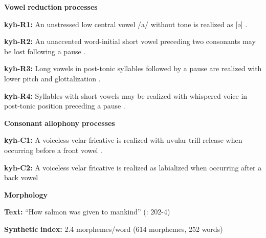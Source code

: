 \begin{styleBody}
\textbf{Vowel} \textbf{reduction} \textbf{processes}
\end{styleBody}

\begin{styleBody}
\textbf{kyh-R1:} An unstressed low central vowel /a/ without tone is realized as [ə] \citep[11]{Bright1957}.
\end{styleBody}

\begin{styleBody}
\textbf{kyh-R2:} An unaccented word-initial short vowel preceding two consonants may be lost following a pause \citep[53]{Bright1957}.
\end{styleBody}

\begin{styleBody}
\textbf{kyh-R3:} Long vowels in post-tonic syllables followed by a pause are realized with lower pitch and glottalization \citep[13]{Bright1957}.
\end{styleBody}

\begin{styleBody}
\textbf{kyh-R4:} Syllables with short vowels may be realized with whispered voice in post-tonic position preceding a pause \citep[13]{Bright1957}.
\end{styleBody}

\begin{styleBody}
\textbf{Consonant} \textbf{allophony} \textbf{processes}
\end{styleBody}

\begin{styleBody}
\textbf{kyh-C1:} A voiceless velar fricative is realized with uvular trill release when occurring before a front vowel \citep{Bright1957}.
\end{styleBody}

\begin{styleBody}
\textbf{kyh-C2:} A voiceless velar fricative is realized as labialized when occurring after a back vowel \citep[8]{Bright1957}
\end{styleBody}

\begin{styleBody}
\textbf{Morphology}
\end{styleBody}

\begin{styleBody}
\textbf{Text:} “How salmon was given to mankind” (\citealt{AnguloFreeland1971}: 202-4)
\end{styleBody}

\begin{styleBody}
\textbf{Synthetic} \textbf{index:} 2.4 morphemes/word (614 morphemes, 252 words)
\end{styleBody}

